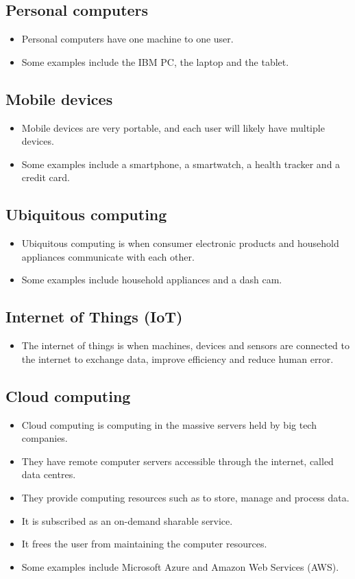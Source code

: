 \documentclass[11pt]{article}
\begin{document}
\subsection{Personal computers}
\label{sec:org05c9684}
\begin{itemize}
\item Personal computers have one machine to one user.
\item Some examples include the IBM PC, the laptop and the tablet.
\end{itemize}
\subsection{Mobile devices}
\label{sec:org53d3640}
\begin{itemize}
\item Mobile devices are very portable, and each user will likely have multiple devices.
\item Some examples include a smartphone, a smartwatch, a health tracker and a credit card.
\end{itemize}
\subsection{Ubiquitous computing}
\label{sec:org1d185a0}
\begin{itemize}
\item Ubiquitous computing is when consumer electronic products and household appliances communicate with each other.
\item Some examples include household appliances and a dash cam.
\end{itemize}
\subsection{Internet of Things (IoT)}
\label{sec:org5290844}
\begin{itemize}
\item The internet of things is when machines, devices and sensors are connected to the internet to exchange data, improve efficiency and reduce human error.
\end{itemize}
\subsection{Cloud computing}
\label{sec:orgc5b7876}
\begin{itemize}
\item Cloud computing is computing in the massive servers held by big tech companies.
\item They have remote computer servers accessible through the internet, called data centres.
\item They provide computing resources such as to store, manage and process data.
\item It is subscribed as an on-demand sharable service.
\item It frees the user from maintaining the computer resources.
\item Some examples include Microsoft Azure and Amazon Web Services (AWS).
\end{itemize}
\end{document}
